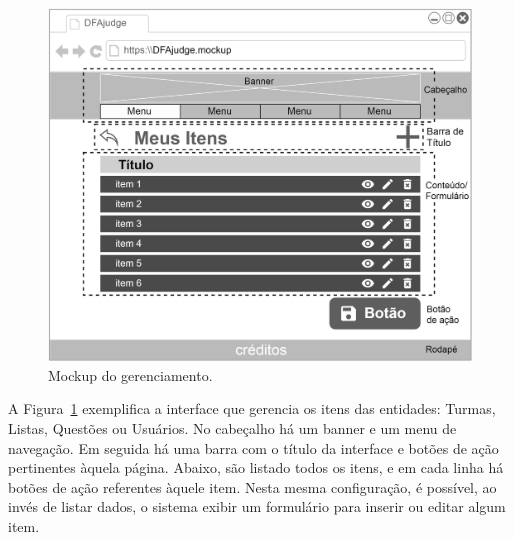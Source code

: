 \documentclass[
	12pt,				%
	openany,
	oneside,
	a4paper,			%
	english,			%
	brazil				%
	]{abntex2}
\begin{document}
\begin{figure}[H]
  \centering
  \includegraphics[width=\textwidth]{mockupGerenciamento.png}%
  \caption{Mockup do gerenciamento.}
  \label{fig:MockupGerenciamento}
  \vspace{-0.5cm}
\end{figure}

  A Figura~\ref{fig:MockupGerenciamento} exemplifica a interface que gerencia os itens das entidades: Turmas, Listas, Questões ou Usuários. No cabeçalho há um banner e um menu de navegação. Em seguida há uma barra com o título da interface e botões de ação pertinentes àquela página. Abaixo, são listado todos os itens, e em cada linha há botões de ação referentes àquele item. Nesta mesma configuração, é possível, ao invés de listar dados, o sistema exibir um formulário para inserir ou editar algum item. %
  
\end{document}
